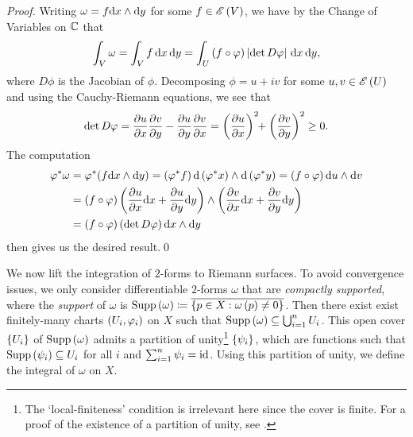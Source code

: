 \documentclass[../Moduli_Spaces_of_Riemann_Surfaces.tex]{subfiles}
\begin{document}
    \begin{proof}
        Writing $\omega=f\mathrm{d} x\wedge\mathrm{d} y$ for some $f\in\mathscr{E}\left(V\right)$, we have by the Change of Variables on $\mathbb{C}$ that
        \begin{equation*}
            \int_V\omega=\int_Vf\,\mathrm{d} x\,\mathrm{d} y=\int_U\left(f\circ\varphi\right)\left|\det D\varphi\right|\,\mathrm{d} x\,\mathrm{d} y,
        \end{equation*}
        where $D\phi$ is the Jacobian of $\phi$. Decomposing $\phi=u+iv$ for some $u,v\in\mathscr{E}\left(U\right)$ and using the Cauchy-Riemann equations, we see that
        \begin{equation*}
            \det D\varphi=\frac{\partial u}{\partial x}\frac{\partial v}{\partial y}-\frac{\partial u}{\partial y}\frac{\partial v}{\partial x}=\left(\frac{\partial u}{\partial x}\right)^2\!\!+\left(\frac{\partial v}{\partial y}\right)^2\geq0.
        \end{equation*}
        The computation
        \begin{equation*}
            \begin{aligned}
                \varphi^\ast\omega&=\varphi^\ast\!\left(f\mathrm{d} x\wedge\mathrm{d} y\right)=\left(\varphi^\ast f\right)\mathrm{d}\left(\varphi^\ast x\right)\wedge\mathrm{d}\left(\varphi^\ast y\right)=\left(f\circ\varphi\right)\mathrm{d} u\wedge \mathrm{d} v \\
                               &=\left(f\circ\varphi\right)\left(\frac{\partial u}{\partial x}\mathrm{d} x+\frac{\partial u}{\partial y}\mathrm{d} y\right)\wedge\left(\frac{\partial v}{\partial x}\mathrm{d} x+\frac{\partial v}{\partial y}\mathrm{d} y\right) \\
                               &=\left(f\circ\varphi\right)\left(\det D\varphi\right)\mathrm{d} x\wedge\mathrm{d} y
            \end{aligned}
        \end{equation*}
        then gives us the desired result.\qed
    \end{proof}
    We now lift the integration of $2$-forms to Riemann surfaces. To avoid convergence issues, we only consider differentiable $2$-forms $\omega$ that are \textit{compactly supported}, where the \textit{support} of $\omega$ is $\operatorname{Supp}\left(\omega\right)\coloneqq\overline{\left\{p\in X:\omega\left(p\right)\neq0\right\}}$. Then there exist exist finitely-many charts $\left(U_i,\varphi_i\right)$ on $X$ such that $\operatorname{Supp}\left(\omega\right)\subseteq\bigcup_{i=1}^{n}U_i$. This open cover $\left\{U_i\right\}$ of $\operatorname{Supp}\left(\omega\right)$ admits a partition of unity\footnote{The `local-finiteness' condition is irrelevant here since the cover is finite. For a proof of the existence of a partition of unity, see \cite[][Theorem 2.23]{leeSM}.} $\left\{\psi_i\right\}$, which are functions such that $\operatorname{Supp}\left(\psi_i\right)\subseteq U_i$ for all $i$ and $\sum_{i=1}^n\psi_i=\operatorname{id}$. Using this partition of unity, we define the integral of $\omega$ on $X$.
\end{document}
